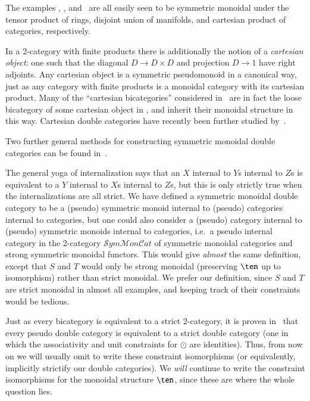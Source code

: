 \begin{eg}
  The examples \lMod, \lnCob, and \lProf\ are all easily seen to be
  symmetric monoidal under the tensor product of rings, disjoint union
  of manifolds, and cartesian product of categories, respectively.
\end{eg}

\begin{rmk}
  In a 2-category with finite products there is additionally the
  notion of a \emph{cartesian object}: one such that the diagonal
  $D\to D\times D$ and projection $D\to 1$ have right adjoints.  Any
  cartesian object is a symmetric pseudomonoid in a canonical way,
  just as any category with finite products is a monoidal category
  with its cartesian product.  Many of the ``cartesian bicategories''
  considered in~\cite{cw:cart-bicats-i,ckww:cartbicats-ii} are in
  fact the loose bicategory of some cartesian object in \cDbl,
  and inherit their monoidal structure in this way.
  Cartesian double categories have recently been further studied by~\cite{aleiferi2018cartesian}.
\end{rmk}

Two further general methods for constructing symmetric monoidal double
categories can be found in~\cite{shulman:frbi}.

\begin{rmk}
  The general yoga of internalization says that an $X$ internal to
  $Y$s internal to $Z$s is equivalent to a $Y$ internal to $X$s
  internal to $Z$s, but this is only strictly true when the
  internalizations are all strict.  We have defined a symmetric
  monoidal double category to be a (pseudo) symmetric monoid internal
  to (pseudo) categories internal to categories, but one could also
  consider a (pseudo) category internal to (pseudo) symmetric monoids
  internal to categories, i.e.\ a pseudo internal category in the
  2-category
  $\mathcal{S}\mathit{ym}\mathcal{M}\mathit{on}\mathcal{C}\mathit{at}$
  of symmetric monoidal categories and strong symmetric monoidal
  functors.  This would give \emph{almost} the same definition, except
  that $S$ and $T$ would only be strong monoidal (preserving $\ten$ up
  to isomorphism) rather than strict monoidal.  We prefer our
  definition, since $S$ and $T$ are strict monoidal in almost all
  examples, and keeping track of their constraints would be tedious.
\end{rmk}

Just as every bicategory is equivalent to a strict 2-category, it is
proven in~\cite{gp:double-limits} that every pseudo double category is
equivalent to a strict double category (one in which the associativity
and unit constraints for $\odot$ are identities).  Thus, from now on
we will usually omit to write these constraint isomorphisms (or
equivalently, implicitly strictify our double categories).  We
\emph{will} continue to write the constraint isomorphisms for the
monoidal structure $\ten$, since these are where the whole question
lies.

